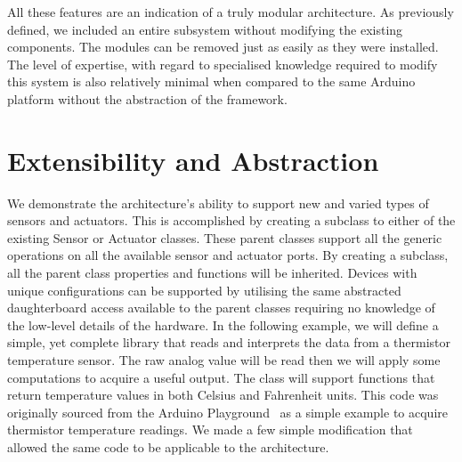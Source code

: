 All these features are an indication of a truly modular architecture. As previously defined, we included an entire subsystem without modifying the existing components. The modules can be removed just as easily as they were installed. The level of expertise, with regard to specialised knowledge required to modify this system is also relatively minimal when compared to  the same Arduino platform without the abstraction of the \xten framework.

\newpage
\section{Extensibility and Abstraction} %
\label{sec:extensibility_abstraction}
We demonstrate the \xten architecture's ability to support new and varied types of sensors and actuators. This is accomplished by creating a subclass to either of the existing Sensor or Actuator classes. These parent classes support all the generic operations on all the available sensor and actuator ports. By creating a subclass, all the parent class properties and functions will be inherited. Devices with unique configurations can be supported by utilising the same abstracted daughterboard access available to the parent classes requiring no knowledge of the low-level details of the hardware.
In the following example, we will define a simple, yet complete library that reads and interprets the data from a thermistor temperature sensor. The raw analog value will be read then we will apply some computations to acquire a useful output. The class will support functions that return temperature values in both Celsius and Fahrenheit units. This code was originally sourced from the Arduino Playground~\parencite{therm} as a simple example to acquire thermistor temperature readings. We made a few simple modification that allowed the same code to be applicable to the \xten architecture.
